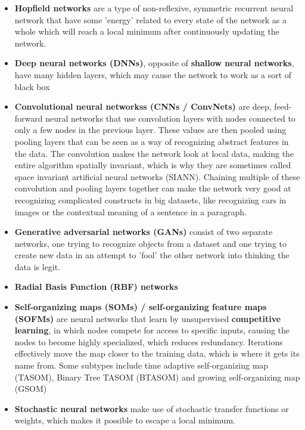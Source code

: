 \begin{itemize}
\begin{itemize}
			\item \textbf{Hopfield networks}
				are a type of non-reflexive, symmetric recurrent neural network that have some 'energy' related to every state of the network as a whole which will reach a local minimum after continuously updating the network.
			\item \textbf{Deep neural networks (DNNs)},
				opposite of \textbf{shallow neural networks}, have many hidden layers, which may cause the network to work as a sort of black box
			\item \textbf{Convolutional neural networkss (CNNs / ConvNets)}
				are deep, feed-forward neural networks that use convolution layers with nodes connected to only a few nodes in the previous layer. These values are then pooled using pooling layers that can be seen as a way of recognizing abstract features in the data. The convolution makes the network look at local data, making the entire algorithm spatially invariant, which is why they are sometimes called space invariant artificial neural networks (SIANN). Chaining multiple of these convolution and pooling layers together can make the network very good at recognizing complicated constructs in big datasets, like recognizing cars in images or the contextual meaning of a sentence in a paragraph.
			\item \textbf{Generative adversarial networks (GANs)}
				consist of two separate networks, one trying to recognize objects from a dataset and one trying to create new data in an attempt to 'fool' the other network into thinking the data is legit.\cite{Li:2013:CAL:2463372.2465801}
			\item \textbf{Radial Basis Function (RBF) networks}
				\cite{rbf}
			\item \textbf{Self-organizing maps (SOMs) / self-organizing feature maps (SOFMs)}
				are neural networks that learn by unsupervised \textbf{competitive learning}, in which nodes compete for access to specific inputs, causing the nodes to become highly specialized, which reduces redundancy. Iterations effectively move the map closer to the training data, which is where it gets its name from. Some subtypes include time adaptive self-organizing map (TASOM), Binary Tree TASOM (BTASOM) and growing self-organizing map (GSOM)
			\item \textbf{Stochastic neural networks}
				make use of stochastic transfer functions or weights, which makes it possible to escape a local minimum. 
		\end{itemize}

\end{itemize}
